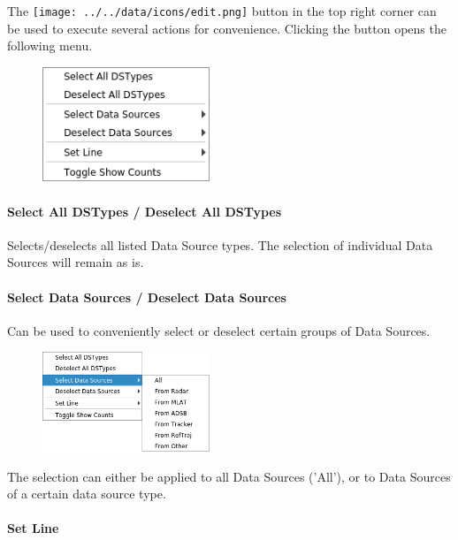 The \texttt{[image: ../../data/icons/edit.png]} button in the top right corner can be used to execute several actions for convenience.
Clicking the button opens the following menu.

\begin{figure}[H]
    \center
    \includegraphics[width=5cm,frame]{figures/ui_data_source_configmenu.png}
\end{figure}

\paragraph{Select All DSTypes / Deselect All DSTypes}

Selects/deselects all listed Data Source types. The selection of individual Data Sources will remain as is.

\paragraph{Select Data Sources / Deselect Data Sources}

Can be used to conveniently select or deselect certain groups of Data Sources.

\begin{figure}[H]
    \center
    \includegraphics[width=5cm,frame]{figures/ui_data_source_configmenu_select.png}
\end{figure}

The selection can either be applied to all Data Sources ('All'), or to Data Sources of a certain data source type. 

\paragraph{Set Line}

